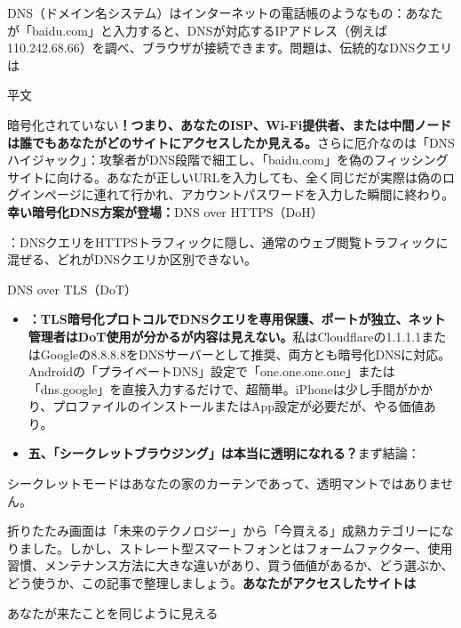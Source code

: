DNS（ドメイン名システム）はインターネットの電話帳のようなもの：あなたが「baidu.com」と入力すると、DNSが対応するIPアドレス（例えば110.242.68.66）を調べ、ブラウザが接続できます。問題は、伝統的なDNSクエリは

平文


暗号化されていない\textbf{！つまり、あなたのISP、Wi-Fi提供者、または中間ノードは誰でもあなたがどのサイトにアクセスしたか見える。}さらに厄介なのは「DNSハイジャック」：攻撃者がDNS段階で細工し、「baidu.com」を偽のフィッシングサイトに向ける。あなたが正しいURLを入力しても、全く同じだが実際は偽のログインページに連れて行かれ、アカウントパスワードを入力した瞬間に終わり。\textbf{幸い暗号化DNS方案が登場：}DNS over HTTPS（DoH）

：DNSクエリをHTTPSトラフィックに隠し、通常のウェブ閲覧トラフィックに混ぜる、どれがDNSクエリか区別できない。

DNS over TLS（DoT）

\begin{itemize}
  \item \textbf{：TLS暗号化プロトコルでDNSクエリを専用保護、ポートが独立、ネット管理者はDoT使用が分かるが内容は見えない。}私はCloudflareの1.1.1.1またはGoogleの8.8.8.8をDNSサーバーとして推奨、両方とも暗号化DNSに対応。Androidの「プライベートDNS」設定で「one.one.one.one」または「dns.google」を直接入力するだけで、超簡単。iPhoneは少し手間がかかり、プロファイルのインストールまたはApp設定が必要だが、やる価値あり。
  \item \textbf{五、「シークレットブラウジング」は本当に透明になれる？}まず結論：
\end{itemize}

シークレットモードはあなたの家のカーテンであって、透明マントではありません。


折りたたみ画面は「未来のテクノロジー」から「今買える」成熟カテゴリーになりました。しかし、ストレート型スマートフォンとはフォームファクター、使用習慣、メンテナンス方法に大きな違いがあり、買う価値があるか、どう選ぶか、どう使うか、この記事で整理しましょう。\textbf{あなたがアクセスしたサイトは}

あなたが来たことを同じように見える

